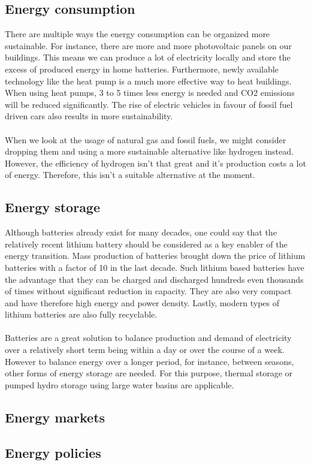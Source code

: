\documentclass[../summary.tex]{subfiles}
\begin{document}
	\subsection{Energy consumption}
	
	There are multiple ways the energy consumption can be organized more sustainable. For instance, there are more and more photovoltaic panels on our buildings. This means we can produce a lot of electricity locally and store the excess of produced energy in home batteries. Furthermore, newly available technology like the heat pump is a much more effective way to heat buildings. When using heat pumps, 3 to 5 times less energy is needed and CO2 emissions will be reduced significantly. The rise of electric vehicles in favour of fossil fuel driven cars also results in more sustainability.
	\\\\
	When we look at the usage of natural gas and fossil fuels, we might consider dropping them and using a more sustainable alternative like hydrogen instead. However, the efficiency of hydrogen isn't that great and it's production costs a lot of energy. Therefore, this isn't a suitable alternative at the moment.
	
	\subsection{Energy storage}
	
	Although batteries already exist for many decades, one could say that the relatively recent lithium battery should be considered as a key enabler of the energy transition. Mass production of batteries brought down the price of lithium batteries with a factor of 10 in the last decade. Such lithium based batteries have the advantage that they can be charged and discharged hundreds even thousands of times without significant reduction in capacity. They are also very compact and have therefore high energy and power density. Lastly, modern types of lithium batteries are also fully recyclable. 
	\\\\
	Batteries are a great solution to balance production and demand of electricity over a relatively short term being within a day or over the course of a week. However to balance energy over a longer period, for instance, between seasons, other forms of energy storage are needed. For this purpose, thermal storage or pumped hydro storage using large water basins are applicable. 
	
	\subsection{Energy markets}
	
	
	
	\subsection{Energy policies}
	
	
	
	
\end{document}
